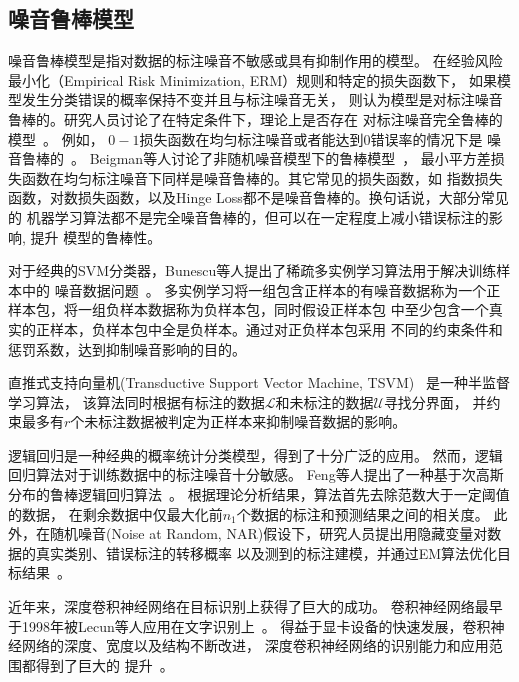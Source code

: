 \documentclass[doctor]{ustcthesis}
\def \L {\mathcal{L}}
\def \U {\mathcal{U}}
\begin{document}
\subsection{噪音鲁棒模型}
噪音鲁棒模型是指对数据的标注噪音不敏感或具有抑制作用的模型。
在经验风险最小化（Empirical Risk Minimization, ERM）规则和特定的损失函数下，
如果模型发生分类错误的概率保持不变并且与标注噪音无关，
则认为模型是对标注噪音鲁棒的。研究人员讨论了在特定条件下，理论上是否存在
对标注噪音完全鲁棒的模型~\cite{manwani2013noise}。 例如，
$0-1$损失函数在均匀标注噪音或者能达到$0$错误率的情况下是
噪音鲁棒的~\cite{thathachar2011networks,sastry2010team}。
Beigman等人讨论了非随机噪音模型下的鲁棒模型~\cite{beigman2009learning}，
最小平方差损失函数在均匀标注噪音下同样是噪音鲁棒的。其它常见的损失函数，如
指数损失函数，对数损失函数，以及Hinge Loss都不是噪音鲁棒的。换句话说，大部分常见的
机器学习算法都不是完全噪音鲁棒的，但可以在一定程度上减小错误标注的影响, 提升
模型的鲁棒性。

对于经典的SVM分类器，Bunescu等人提出了稀疏多实例学习算法用于解决训练样本中的
噪音数据问题~\cite{bunescu2007multiple,vijayanarasimhan2008keywords}。
多实例学习将一组包含正样本的有噪音数据称为一个正样本包，将一组负样本数据称为负样本包，同时假设正样本包
中至少包含一个真实的正样本，负样本包中全是负样本。通过对正负样本包采用
不同的约束条件和惩罚系数，达到抑制噪音影响的目的。

直推式支持向量机(Transductive Support Vector Machine, TSVM)
~\cite{sindhwani2006large,vo2015deep}是一种半监督学习算法，
该算法同时根据有标注的数据$\L$和未标注的数据$\U$寻找分界面，
并约束最多有$r$个未标注数据被判定为正样本来抑制噪音数据的影响。

逻辑回归是一种经典的概率统计分类模型，得到了十分广泛的应用。
然而，逻辑回归算法对于训练数据中的标注噪音十分敏感。
Feng等人提出了一种基于次高斯分布的鲁棒逻辑回归算法~\cite{feng2014robust}。
根据理论分析结果，算法首先去除范数大于一定阈值的数据，
在剩余数据中仅最大化前$n_1$个数据的标注和预测结果之间的相关度。
此外，在随机噪音(Noise at Random, NAR)假设下，研究人员提出用隐藏变量对数据的真实类别、错误标注的转移概率
以及测到的标注建模，并通过EM算法优化目标结果~\cite{izadinia2014image,izadinia2015deep}。

近年来，深度卷积神经网络在目标识别上获得了巨大的成功。
卷积神经网络最早于1998年被Lecun等人应用在文字识别上~\cite{lecun1998gradient}。
得益于显卡设备的快速发展，卷积神经网络的深度、宽度以及结构不断改进，
深度卷积神经网络的识别能力和应用范围都得到了巨大的
提升~\cite{krizhevsky2012imagenet,simonyan2014very,szegedy2015going,szegedy2016rethinking,szegedy2016inception,he2016deep}。
\end{document}
